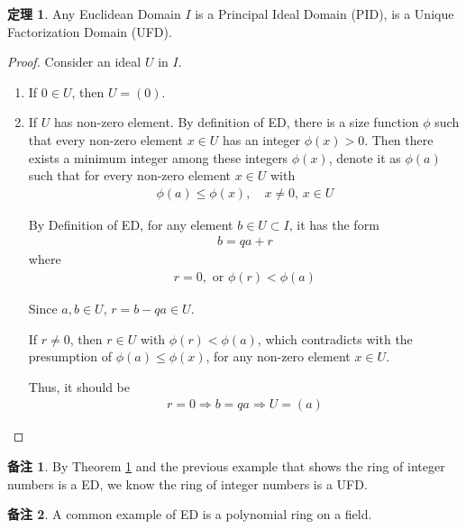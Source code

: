 \documentclass[utf8]{ctexbook}
\theoremstyle{definition}
\newtheorem{prototheorem}{定理}[section]
\newenvironment{theorem}
   {\colorlet{shadecolor}{red!30}\begin{shaded}\begin{prototheorem}}
   {\end{prototheorem}\end{shaded}}
\newtheorem{memo}{备注}[section]
\begin{document}
\begin{theorem}
\label{theorem_ED_is_PID_is_UFD}
Any Euclidean Domain $I$ is a Principal Ideal Domain (PID), is a Unique Factorization Domain (UFD).
\end{theorem}

\begin{proof}
Consider an ideal $U$ in $I$.
\begin{enumerate}
\item{If $0 \in U$, then $U = (0)$.}
\item{If $U$ has non-zero element. By definition of ED, there is a size function $\phi$ such that every non-zero element $x \in U$ has an integer $\phi(x) > 0$. Then there exists a minimum integer among these integers $\phi(x)$, denote it as $\phi(a)$ such that for every non-zero element $x \in U$ with
\begin{align*}
\phi(a) \leq \phi(x), \quad x \neq 0, \, x \in U
\end{align*}

By Definition of ED, for any element $b \in U \subset I$, it has the form
\begin{align*}
b = q a + r 
\end{align*}
where 
\begin{align*}
r = 0, \mbox{ or } \phi(r) < \phi(a)
\end{align*}

Since $a, b \in U$, $r = b - q a \in U$.

If $r \neq 0$, then $r \in U$ with $\phi(r) < \phi(a)$, which contradicts with the presumption of $\phi(a) \leq \phi(x)$, for any non-zero element $x \in U$.

Thus, it should be
\begin{align*}
r = 0 \Longrightarrow b = q a \Longrightarrow U = (a)
\end{align*}

}
\end{enumerate}

\end{proof}

\begin{memo}
By Theorem \ref{theorem_ED_is_PID_is_UFD} and the previous example that shows the ring of integer numbers is a ED, we know the ring of integer numbers is a UFD.
\end{memo}

\begin{memo}
A common example of ED is a polynomial ring on a field.
\end{memo}
\end{document}
